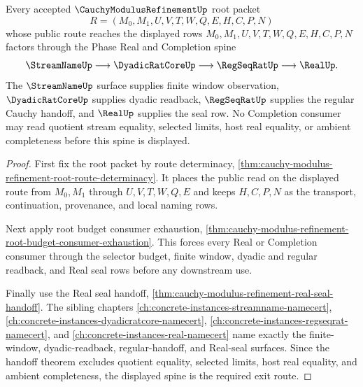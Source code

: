 \begin{theorem}
\label{thm:cauchy-modulus-refinement-open-phase-exit-spine}
Every accepted $\CauchyModulusRefinementUp$ root packet
$$
R=(M_0,M_1,U,V,T,W,Q,E,H,C,P,N)
$$
whose public route reaches the displayed rows $M_0,M_1,U,V,T,W,Q,E,H,C,P,N$ factors through the Phase Real and Completion spine
$$
\StreamNameUp \longrightarrow \DyadicRatCoreUp \longrightarrow \RegSeqRatUp \longrightarrow \RealUp.
$$
The $\StreamNameUp$ surface supplies finite window observation, $\DyadicRatCoreUp$ supplies dyadic readback, $\RegSeqRatUp$ supplies the regular Cauchy handoff, and $\RealUp$ supplies the seal row. No Completion consumer may read quotient stream equality, selected limits, host real equality, or ambient completeness before this spine is displayed.
\end{theorem}
\begin{proof}
First fix the root packet by route determinacy, \autoref{thm:cauchy-modulus-refinement-root-route-determinacy}. It places the public read on the displayed route from $M_0,M_1$ through $U,V,T,W,Q,E$ and keeps $H,C,P,N$ as the transport, continuation, provenance, and local naming rows.

Next apply root budget consumer exhaustion, \autoref{thm:cauchy-modulus-refinement-root-budget-consumer-exhaustion}. This forces every Real or Completion consumer through the selector budget, finite window, dyadic and regular readback, and Real seal rows before any downstream use.

Finally use the Real seal handoff, \autoref{thm:cauchy-modulus-refinement-real-seal-handoff}. The sibling chapters \autoref{ch:concrete-instances-streamname-namecert}, \autoref{ch:concrete-instances-dyadicratcore-namecert}, \autoref{ch:concrete-instances-regseqrat-namecert}, and \autoref{ch:concrete-instances-real-namecert} name exactly the finite-window, dyadic-readback, regular-handoff, and Real-seal surfaces. Since the handoff theorem excludes quotient equality, selected limits, host real equality, and ambient completeness, the displayed spine is the required exit route.
\end{proof}

